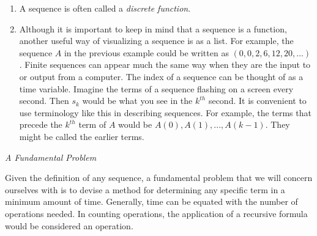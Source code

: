 \documentclass[10pt,]{book}
\theoremstyle{plain}
\theoremstyle{definition}
\theoremstyle{definition}
\theoremstyle{definition}
\theoremstyle{definition}
\numberwithin{equation}{section}
\begin{document}
\leavevmode%
\begin{enumerate}[label=\arabic*]
\item\hypertarget{li-19}{}A sequence is often called a  \emph{discrete function}.%
\item\hypertarget{li-20}{}Although it is important to keep in mind that a sequence is a function, another useful way of visualizing a sequence is as a list. For example,
the sequence \(A\) in the previous example could be written as \((0, 0, 2, 6, 12, 20, \dots )\). Finite sequences can appear much the same way when they are the input to or output from a computer. The index of a sequence can be thought of as a time variable. Imagine the terms of a sequence flashing on a screen every second. Then \(s_k\) would be what you see in the \(k^{th}\) second. It is convenient to use terminology like this in describing sequences.
For example, the terms that precede the \(k^{th}\) term of \(A\) would be \(A (0), A(1), . . . , A(k -1)\).  They might be called the earlier terms.%
\end{enumerate}
%
\par
\emph{A Fundamental Problem}%
\par
Given the definition of any sequence, a fundamental problem that we will concern ourselves with is to devise a method for determining any specific term in a minimum amount of time. Generally, time can be equated with the number of operations needed. In counting operations, the application of a recursive formula would be considered an operation.%
\par
\leavevmode%
\end{document}
